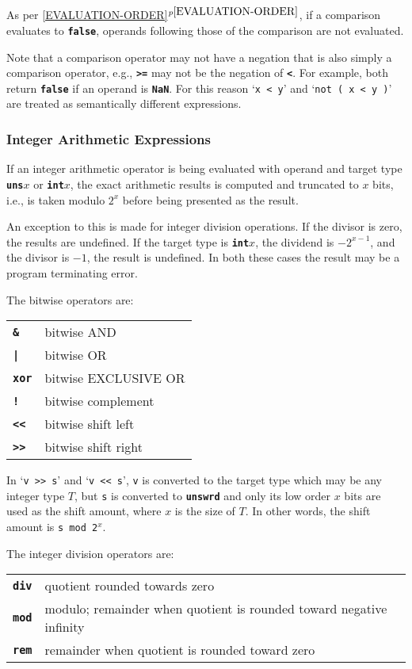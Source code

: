 \documentclass[12pt]{article}
\newcommand{\TT}[1]{{\tt \bfseries #1}}
\newcommand{\itemref}[1]{\ref{#1}$^{p\pageref{#1}}$}
\begin{document}
As per \itemref{EVALUATION-ORDER}, if a comparison evaluates
to \TT{false}, operands following those of the comparison
are not evaluated.

Note that a comparison operator may not have a negation that is
also simply a comparison operator, e.g., \TT{>=} may not be the
negation of \TT{<}.  For example, both return \TT{false} if an
operand is \TT{NaN}.  For this reason `{\tt x < y}' and
`{\tt not ( x < y )}' are treated as semantically different
expressions.

\subsubsection{Integer Arithmetic Expressions}

If an integer arithmetic operator is being evaluated with
operand and target type \TT{uns$x$} or \TT{int$x$}, the
exact arithmetic results is computed and truncated to
$x$ bits, i.e., is taken modulo $2^x$ before being presented
as the result.

An exception to this is made for integer division operations.
If the divisor is zero, the results are undefined.  If the
target type is \TT{int$x$}, the dividend is $-2^{x-1}$, and
the divisor is $-1$, the result is undefined.  In both these
cases the result may be a program terminating error.

The bitwise operators are:
\begin{center}
\begin{tabular}{ll}
\TT{\&}		& bitwise AND \\
\TT{|}		& bitwise OR \\
\TT{xor}	& bitwise EXCLUSIVE OR \\
\TT{!}		& bitwise complement \\
\TT{<{}<}	& bitwise shift left \\
\TT{>{}>}	& bitwise shift right \\
\end{tabular}
\end{center}

In `{\tt v >{}> s}' and `{\tt v <{}< s}', {\tt v} is converted to the
target type which may be any integer type $T$, but {\tt s} is converted
to \TT{unswrd} and only its low order $x$ bits are used as the
shift amount, where $x$ is the size of $T$.
In other words, the shift amount is {\tt s mod 2$^x$}.

The integer division operators are:
\begin{center}
\begin{tabular}{ll}
\TT{div}	& quotient rounded towards zero \\
\TT{mod}	& modulo; remainder when quotient is rounded
                  toward negative infinity \\
\TT{rem}	& remainder when quotient is rounded toward zero \\
\end{tabular}
\end{center}
\end{document}
